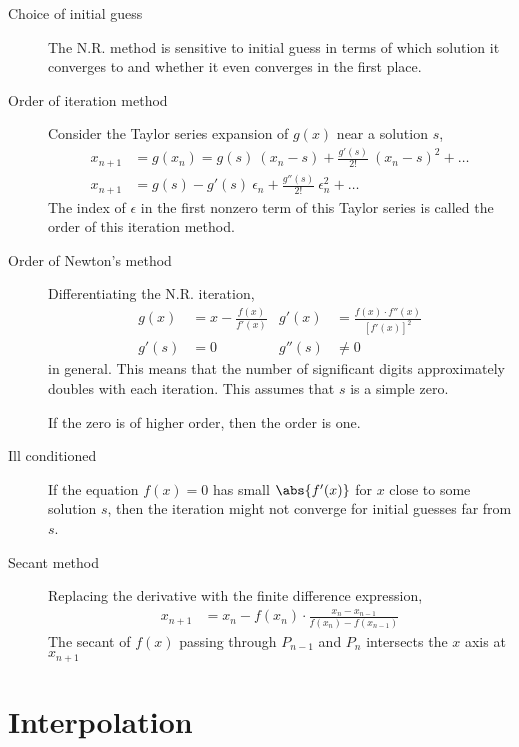 \begin{description}
    \item[Choice of initial guess] The N.R. method is sensitive to initial guess in
        terms of which solution it converges to and whether it even converges in the
        first place.

    \item[Order of iteration method] Consider the Taylor series expansion of $ g(x) $
        near a solution $ s $,
        \begin{align}
            x_{n+1} & = g(x_n) = g(s)\ (x_n - s) + \frac{g'(s)}{2!}\ (x_n-s)^2 + \dots \\
            x_{n+1} & = g(s) - g'(s)\ \epsilon_n + \frac{g''(s)}{2!}\ \epsilon_n^2
            + \dots
        \end{align}
        The index of $ \epsilon $ in the first nonzero term of this Taylor series is
        called the order of this iteration method.

    \item[Order of Newton's method] Differentiating the N.R. iteration,
        \begin{align}
            g(x)  & = x - \frac{f(x)}{f'(x)} & g'(x)  & = \frac{f(x)
            \cdot f''(x)}{[f'(x)]^2}                                 \\
            g'(s) & = 0                      & g''(s) & \neq 0
        \end{align}
        in general. This means that the number of significant digits approximately
        doubles with each iteration. This assumes that $ s $ is a simple zero. \par
        If the zero is of higher order, then the order is one.

    \item[Ill conditioned] If the equation $ f(x) = 0 $ has small $ \abs{f'(x)} $ for
        $ x $ close to some solution $ s $, then the iteration might not converge
        for initial guesses far from $ s $.

    \item[Secant method] Replacing the derivative with the finite difference expression,
        \begin{align}
            x_{n+1} & = x_n - f(x_n) \cdot \frac{x_{n} - x_{n-1}}{f(x_n) - f(x_{n-1})}
        \end{align}
        The secant of $ f(x) $ passing through $ P_{n-1} $ and $ P_n $ intersects the
        $ x $ axis at $ x_{n+1} $
\end{description}

\section{Interpolation}

